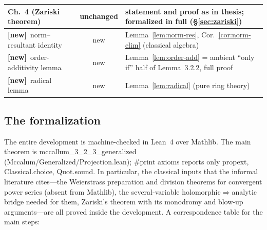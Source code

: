 \documentclass[11pt,a4paper]{article}
\theoremstyle{plain}
\theoremstyle{definition}
\newcommand{\code}[1]{{\ttfamily\small #1}}
\newcommand{\NEW}{\textbf{[new]}}
\begin{document}
\begin{center}
\begin{tabular}{|p{5.4cm}|c|p{7.2cm}|}
\hline
Ch.~4 (Zariski theorem) & unchanged & statement and proof as in thesis;
formalized in full (\S\ref{sec:zariski}) \\
\hline
\NEW\ norm--resultant identity & new & Lemma~\ref{lem:norm-res},
Cor.~\ref{cor:norm-elim} (classical algebra) \\
\hline
\NEW\ order-additivity lemma & new & Lemma~\ref{lem:order-add} = ambient
``only if'' half of Lemma~3.2.2, full proof \\
\hline
\NEW\ radical lemma & new & Lemma~\ref{lem:radical} (pure ring theory) \\
\hline
\end{tabular}
\end{center}

\subsection{The formalization}

The entire development is machine-checked in Lean~4 over Mathlib. The main
theorem is \code{mccallum\_3\_2\_3\_generalized}
(\code{Mccalum/Generalized/Projection.lean}); \code{\#print axioms} reports
only \code{propext}, \code{Classical.choice}, \code{Quot.sound}. In
particular, the classical inputs that the informal literature cites---the
Weierstrass preparation and division theorems for convergent power series
(absent from Mathlib), the several-variable
holomorphic$\Rightarrow$analytic bridge needed for them, Zariski's theorem
with its monodromy and blow-up arguments---are all proved inside the
development. A correspondence table for the main steps:
\end{document}

